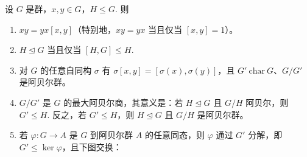\begin{proposition}\label{pro:5.7}
设 \(G\) 是群，\(x, y \in G\)，\(H \leq G\). 则

\begin{enumerate}[label=(\arabic*)]
\item \(xy = yx[x, y]\)（特别地，\(xy = yx\) 当且仅当 \([x, y] = 1\)）。

\item \(H \trianglelefteq G\) 当且仅当 \([H, G] \leq H\).

\item 对 \(G\) 的任意自同构 \(\sigma\) 有 \(\sigma[x, y] = [\sigma(x), \sigma(y)]\)，且 \(G'\ \mathrm{char}\ G\)、\(G/G'\) 是阿贝尔群。

\item \(G/G'\) 是 \(G\) 的最大阿贝尔商，其意义是：若 \(H \trianglelefteq G\) 且 \(G/H\) 阿贝尔，则 \(G' \leq H\). 反之，若 \(G' \leq H\)，则 \(H \trianglelefteq G\) 且 \(G/H\) 是阿贝尔群。

\item 若 \(\varphi : G \to A\) 是 \(G\) 到阿贝尔群 \(A\) 的任意同态，则 \(\varphi\) 通过 \(G'\) 分解，即 \(G' \leq \ker \varphi\)，且下图交换：
\begin{center}
\end{center}
\end{enumerate}
\end{proposition}

